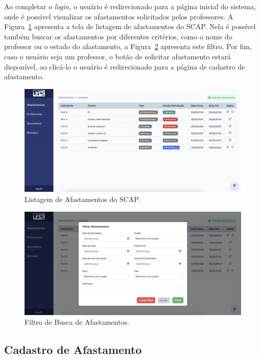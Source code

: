 Ao completar o \textit{login}, o usuário é redirecionado para a página inicial do sistema, onde é possível
visualizar os afastamentos solicitados pelos professores. A Figura~\ref{fig-listagem-afastamentos} apresenta a tela de listagem de afastamentos
do SCAP. Nela é possível também buscar os afastamentos por diferentes critérios, como o nome do professor ou o estado do afastamento,
a Figura~\ref{fig-filtro-afastamentos} apresenta este filtro. Por fim, caso o usuário seja um professor,
o botão de solicitar afastamento estará disponível, ao clicá-lo o usuário é redirecionado para a página de cadastro de afastamento.

\begin{figure}[h!]
    \centering
    \includegraphics[width=\textwidth]{figuras/prints-app/fig-lista-afastamento.png}
    \caption{Listagem de Afastamentos do SCAP.}
    \label{fig-listagem-afastamentos}
\end{figure}

\begin{figure}[h!]
    \centering
    \includegraphics[width=\textwidth]{figuras/prints-app/fig-filtro-afastamento.png}
    \caption{Filtro de Busca de Afastamentos.}
    \label{fig-filtro-afastamentos}
\end{figure}

\subsection{Cadastro de Afastamento}
\label{subsec-projeto-cadastro-afastamento}

